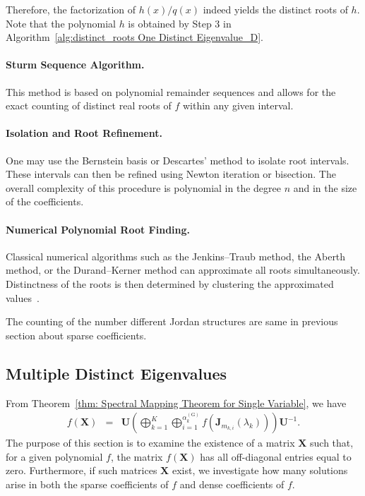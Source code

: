 \documentclass[11pt]{article}
\begin{document}
Therefore, the factorization of \( h(x)/q(x) \) indeed yields the distinct roots of \( h \). Note that the polynomial $h$ is obtained by Step 3 in Algorithm~\ref{alg:distinct_roots One Distinct Eigenvalue_D}.

\paragraph{Sturm Sequence Algorithm.} 
This method is based on polynomial remainder sequences and allows for the exact counting of distinct real roots of \( f \) within any given interval.  

\paragraph{Isolation and Root Refinement.} 
One may use the Bernstein basis or Descartes’ method to isolate root intervals. These intervals can then be refined using Newton iteration or bisection. The overall complexity of this procedure is polynomial in the degree \( n \) and in the size of the coefficients.  

\paragraph{Numerical Polynomial Root Finding.} 
Classical numerical algorithms such as the Jenkins–Traub method, the Aberth method, or the Durand–Kerner method can approximate all roots simultaneously. Distinctness of the roots is then determined by clustering the approximated values~\cite{Stoer2002Introduction}.  

The counting of the number different Jordan structures are same in previous section about sparse coefficients. 

\subsection{Multiple Distinct Eigenvalues}\label{sec':Multiple Distinct Eigenvalues_D}

From Theorem~\ref{thm: Spectral Mapping Theorem for Single Variable}, we have 
% 
\begin{eqnarray}
f(\bm{X})&=& \bm{U}\left(\bigoplus\limits_{k=1}^{K}\bigoplus\limits_{i=1}^{\alpha_{k}^{(\mathrm{G})}}f(\bm{J}_{m_{k,i}}(\lambda_{k}))\right)\bm{U}^{-1}.
\end{eqnarray}
%
The purpose of this section is to examine the existence of a matrix $\bm{X}$ such that, for a given polynomial $f$, the matrix $f(\bm{X})$ has all off-diagonal entries equal to zero. Furthermore, if such matrices $\bm{X}$ exist, we investigate how many solutions arise in both the sparse coefficients of $f$ and dense coefficients of  $f$.
\end{document}
